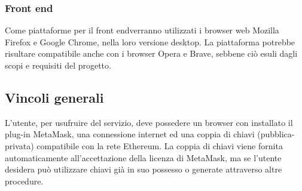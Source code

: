 \subsubsection{Front end}
Come piattaforme per il front end\glosp verranno utilizzati i browser web Mozilla Firefox e Google Chrome, nella loro versione desktop. La piattaforma potrebbe risultare compatibile anche con i browser Opera e Brave, sebbene ciò esuli dagli scopi e requisiti del progetto.

\subsection{Vincoli generali}
L’utente, per usufruire del servizio, deve possedere un browser con installato il plug-in MetaMask\glo, una connessione internet ed una coppia di chiavi (pubblica-privata) compatibile con la rete Ethereum\glo. La coppia di chiavi viene fornita automaticamente all'accettazione della licenza di MetaMask\glo, ma se l’utente desidera può utilizzare chiavi già in suo possesso o generate attraverso altre procedure.

 
